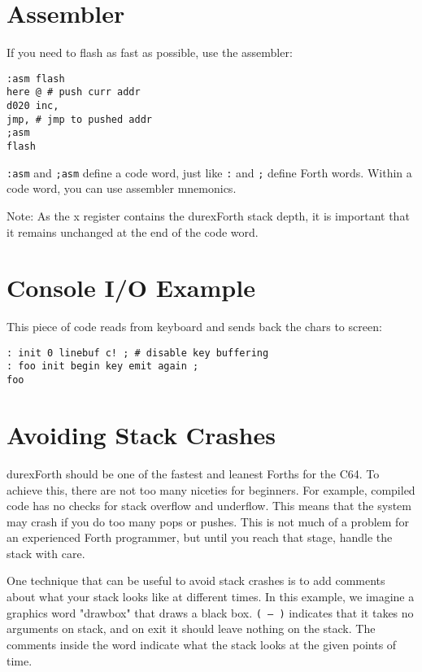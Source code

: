 \section{Assembler}

If you need to flash as fast as possible, use the assembler:

\begin{verbatim}
:asm flash
here @ # push curr addr
d020 inc,
jmp, # jmp to pushed addr
;asm
flash
\end{verbatim}

\texttt{:asm} and \texttt{;asm} define a code word, just like \texttt{:} and \texttt{;} define Forth words. Within a code word, you can use assembler mnemonics. 

Note: As the x register contains the durexForth stack depth, it is important that it remains unchanged at the end of the code word.

\section{Console I/O Example}

This piece of code reads from keyboard and sends back the chars to screen:

\begin{verbatim}
: init 0 linebuf c! ; # disable key buffering
: foo init begin key emit again ;
foo
\end{verbatim}

\section{Avoiding Stack Crashes}

durexForth should be one of the fastest and leanest Forths for the C64. To achieve this, there are
not too many niceties for beginners. For example, compiled code has no checks for stack overflow
and underflow. This means that the system may crash if you do too many pops or pushes. This is not
much of a problem for an experienced Forth programmer, but until you reach that stage, handle the
stack with care.

One technique that can be useful to avoid stack crashes is to
add comments about what your stack looks like at different times.
In this example, we imagine a graphics word "drawbox" that draws a black box.
\texttt{( -- )} indicates that it takes no arguments on stack, and on exit it should
leave nothing on the stack. The comments inside the word indicate what the stack
looks at the given points of time.

